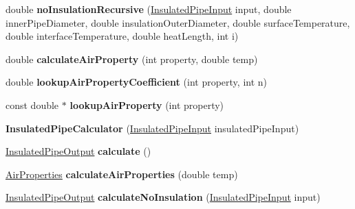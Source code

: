 \begin{DoxyCompactItemize}
\item 
\mbox{\label{class_insulated_pipe_calculator_a9659b458041d78e7ae8cd6521b7ffb32}} 
double {\bfseries no\+Insulation\+Recursive} (\hyperlink{class_insulated_pipe_input}{Insulated\+Pipe\+Input} input, double inner\+Pipe\+Diameter, double insulation\+Outer\+Diameter, double surface\+Temperature, double interface\+Temperature, double heat\+Length, int i)
\item 
\mbox{\label{class_insulated_pipe_calculator_a411f18d08cfd339784cbafde971c875a}} 
double {\bfseries calculate\+Air\+Property} (int property, double temp)
\item 
\mbox{\label{class_insulated_pipe_calculator_ad53128ebc9650dcf15e1ca64820cfa1b}} 
double {\bfseries lookup\+Air\+Property\+Coefficient} (int property, int n)
\item 
\mbox{\label{class_insulated_pipe_calculator_a416a94266357935050f404f7a622995b}} 
const double $\ast$ {\bfseries lookup\+Air\+Property} (int property)
\item 
\mbox{\label{class_insulated_pipe_calculator_a829afd10d8b97bb5bcfd936b5b153ce5}} 
{\bfseries Insulated\+Pipe\+Calculator} (\hyperlink{class_insulated_pipe_input}{Insulated\+Pipe\+Input} insulated\+Pipe\+Input)
\item 
\mbox{\label{class_insulated_pipe_calculator_a12cf1b2f8aa76989c6e805cbedfe0b2a}} 
\hyperlink{class_insulated_pipe_output}{Insulated\+Pipe\+Output} {\bfseries calculate} ()
\item 
\mbox{\label{class_insulated_pipe_calculator_ac23f5e548594269d1548f9959906c988}} 
\hyperlink{class_air_properties}{Air\+Properties} {\bfseries calculate\+Air\+Properties} (double temp)
\item 
\mbox{\label{class_insulated_pipe_calculator_a47aba38ca8bcf6c4e873fdda75e7c982}} 
\hyperlink{class_insulated_pipe_output}{Insulated\+Pipe\+Output} {\bfseries calculate\+No\+Insulation} (\hyperlink{class_insulated_pipe_input}{Insulated\+Pipe\+Input} input)

\end{DoxyCompactItemize}
